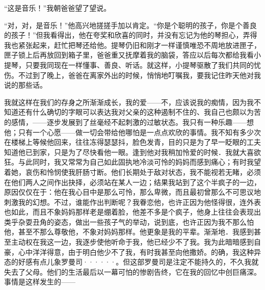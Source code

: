 \documentclass[12pt, UTF8]{ctexbook}
\begin{document}
\par “这是音乐！”我朝爸爸望了望说。
\par “对，对，是音乐！”他高兴地搓搓手加以肯定。“你是个聪明的孩子，你是个善良的孩子！”但我看得出，他在夸奖和欣喜的同时，并没有忘记为他的琴担心，弄得我也紧张起来，赶忙把琴还给他。提琴仍旧和刚才一样谨慎唯恐不周地放进匣子，匣子锁上后再放回到箱子里，爸爸重又抚摩着我的脑袋，答应以后每次都给我看小提琴，只要我同现在一样懂事、善良、听话。就这样，小提琴驱散了我们共同的忧伤。不过到了晚上，爸爸在离家外出的时候，悄悄地叮嘱我，要我记住昨天他对我说的那些话。
\par 我就这样在我们的存身之所渐渐成长，我的爱——不，应该说我的痴情，因为我不知道还有什么确切的字眼可以表达我对父亲的这种遏制不住的、我自己也颇以为苦的感情，——逐步发展到了丝毫经不起刺激的过敏状态。我只有一种乐趣——想他；只有一个心愿——做一切会带给他哪怕是一点点欢欣的事情。我不知有多少次在楼梯上等候他回来，往往冻得瑟瑟抖，脸色发青，目的只是为了早一眨眼的工夫知道他已到家，只是为了尽快看他一眼。逢到他对我稍加怜爱的时候．我就大喜欲狂。与此同时，我又常常为自己如此固执地冷淡可怜的妈妈而感到痛心；有时我望着她，哀伤和怜悯使我肝肠寸断。他们长期处于敌对状态，我不能视若无睹，必须在他们两人之间作出抉择，必须站在某人一边；结果我站到了这个半疯子的一边，原因仅仅在于：他在我心目中是那么可怜，那么卑微，而且最初曾那么不可思议地刺激我的幻想。不过，谁能作出判断呢？我眷恋他，也许正因为他怪得很，连外表也如此，而且不象妈妈那样老是绷着脸，他差不多是个疯子，他身上往往会表现出类乎杂耍丑角的姿态，做出一些孩子气的举动，说到底，也许正因为我不那么怕他，甚至不那么尊敬他，不象对妈妈那样。他更象是我的平辈。渐渐地．我感到甚至主动权在我这一边，我逐步使他听命于我，他已经少不了我。我为此暗暗感到自豪，心中洋洋得意，由于明白他少不了我，有时我甚至向他撒娇。的确，我这种异态的好感有点儿象罗曼司······。但这部罗曼司是注定不能持久的，不久我就失去了父母。他们的生活最后以一幕可怕的惨剧告终，它在我的回忆中创巨痛深。事情是这样发生的——
\newpage
\end{document}
